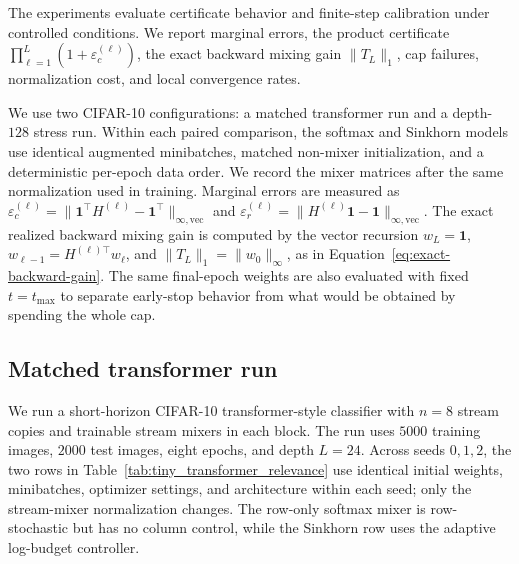 \documentclass[10pt]{article}
\numberwithin{equation}{section}
\theoremstyle{plain}
\theoremstyle{definition}
\theoremstyle{remark}
\newcommand{\ones}{\mathbf{1}}
\begin{document}
The experiments evaluate certificate behavior and finite-step calibration under
controlled conditions. We report marginal errors, the product
certificate \(\prod_{\ell=1}^L(1+\varepsilon_c^{(\ell)})\), the exact backward
mixing gain \(\|T_L\|_1\), cap failures, normalization cost, and local
convergence rates.

We use two CIFAR-10 configurations: a matched transformer run and a depth-\(128\)
stress run. Within each paired comparison, the softmax and Sinkhorn models use
identical augmented minibatches, matched non-mixer initialization, and a
deterministic per-epoch data order. We record the mixer matrices after the same
normalization used in training. Marginal errors are measured as
\(\varepsilon_c^{(\ell)}=\|\ones^\top H^{(\ell)}-\ones^\top\|_{\infty,\mathrm{vec}}\)
and
\(\varepsilon_r^{(\ell)}=\|H^{(\ell)}\ones-\ones\|_{\infty,\mathrm{vec}}\).
The exact realized backward mixing gain is computed by the vector recursion
\(w_L=\ones\), \(w_{\ell-1}=H^{(\ell)\top}w_\ell\), and
\(\|T_L\|_1=\|w_0\|_\infty\), as in Equation~\eqref{eq:exact-backward-gain}. The same
final-epoch weights are also evaluated with fixed \(t=t_{\max}\) to separate early-stop
behavior from what would be obtained by spending the whole cap.

\subsection{Matched transformer run}
We run a short-horizon CIFAR-10
transformer-style classifier with \(n=8\) stream copies and trainable stream mixers in
each block. The run uses \(5000\) training images, \(2000\) test images, eight
epochs, and depth \(L=24\). Across seeds \(0,1,2\), the two rows in
Table~\ref{tab:tiny_transformer_relevance} use identical initial weights, minibatches,
optimizer settings, and architecture within each seed; only the stream-mixer
normalization changes. The row-only softmax mixer is row-stochastic but has no column
control, while the Sinkhorn row uses the adaptive log-budget controller.
\end{document}
